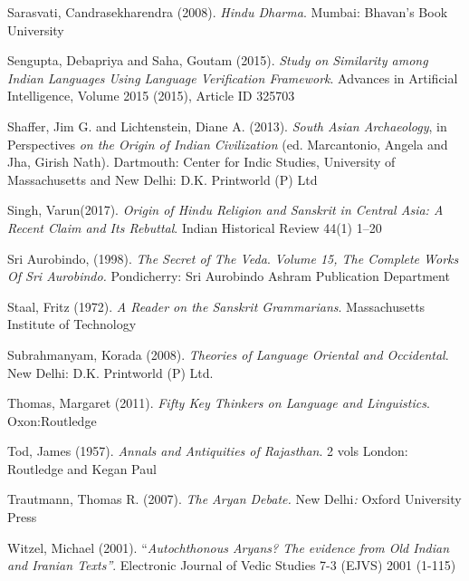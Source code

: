 \begin{thebibliography}{99}
  Sarasvati, Candrasekharendra (2008). \textit{Hindu Dharma}. Mumbai: Bhavan’s Book University 

  Sengupta, Debapriya and Saha, Goutam (2015). \textit{Study on Similarity among Indian Languages Using Language Verification Framework}. Advances in Artificial Intelligence, Volume 2015 (2015), Article ID 325703

  Shaffer, Jim G. and Lichtenstein, Diane A. (2013). \textit{South Asian Archaeology}, in Perspectives \textit{on the Origin of Indian Civilization} (ed. Marcantonio, Angela and Jha, Girish Nath). Dartmouth: Center for Indic Studies, University of Massachusetts and New Delhi: D.K. Printworld (P) Ltd

  Singh, Varun(2017). \textit{Origin of Hindu Religion and Sanskrit in Central Asia: A Recent Claim and Its Rebuttal}. Indian Historical Review 44(1) 1–20

  Sri Aurobindo, (1998). \textit{The Secret of The Veda}. \textit{Volume 15, The Complete Works Of Sri Aurobindo.} Pondicherry: Sri Aurobindo Ashram Publication Department

  Staal, Fritz (1972). \textit{A Reader on the Sanskrit Grammarians}. Massachusetts Institute of Technology

  Subrahmanyam, Korada (2008). \textit{Theories of Language Oriental and Occidental}. New Delhi: D.K. Printworld (P) Ltd. 

  Thomas, Margaret (2011). \textit{Fifty Key Thinkers on Language and Linguistics}. Oxon:Routledge

  Tod, James (1957). \textit{Annals and Antiquities of Rajasthan}. 2 vols London: Routledge and Kegan Paul

  Trautmann, Thomas R. (2007). \textit{The Aryan Debate.} New Delhi\textit{: }Oxford University Press

  Witzel, Michael (2001). “\textit{Autochthonous Aryans? The evidence from Old Indian and Iranian Texts”}. Electronic Journal of Vedic Studies 7-3 (EJVS) 2001 (1-115)

 \end{thebibliography}

\theendnotes

